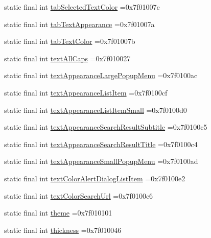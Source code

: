 \begin{DoxyCompactItemize}
\item 
static final int \hyperlink{classcheck_1_1test_1_1_r_1_1attr_a270a1ff857735c964f5bcf59290f4b71}{tab\+Selected\+Text\+Color} =0x7f01007c
\item 
static final int \hyperlink{classcheck_1_1test_1_1_r_1_1attr_ab5c0ef23c7153d895773e5776a6bedee}{tab\+Text\+Appearance} =0x7f01007a
\item 
static final int \hyperlink{classcheck_1_1test_1_1_r_1_1attr_a5429daadf498e6cbc4dec50f3c1251e3}{tab\+Text\+Color} =0x7f01007b
\item 
static final int \hyperlink{classcheck_1_1test_1_1_r_1_1attr_a09d1fb38439d083ce88110c7038a7949}{text\+All\+Caps} =0x7f010027
\item 
static final int \hyperlink{classcheck_1_1test_1_1_r_1_1attr_a378cf97243180991de45fbf2a470b74f}{text\+Appearance\+Large\+Popup\+Menu} =0x7f0100ac
\item 
static final int \hyperlink{classcheck_1_1test_1_1_r_1_1attr_a0903b5738e5ebb9f752a3eeb9edb6438}{text\+Appearance\+List\+Item} =0x7f0100cf
\item 
static final int \hyperlink{classcheck_1_1test_1_1_r_1_1attr_a207e3b80940457620df45d83ed20ab6d}{text\+Appearance\+List\+Item\+Small} =0x7f0100d0
\item 
static final int \hyperlink{classcheck_1_1test_1_1_r_1_1attr_add36b7b3af37d5ad8320ceb443d2dd2f}{text\+Appearance\+Search\+Result\+Subtitle} =0x7f0100c5
\item 
static final int \hyperlink{classcheck_1_1test_1_1_r_1_1attr_a13a9931a99a930b514fe408c215c4cd6}{text\+Appearance\+Search\+Result\+Title} =0x7f0100c4
\item 
static final int \hyperlink{classcheck_1_1test_1_1_r_1_1attr_a8b92407d50d5bf64b97cf69cd93cfc6e}{text\+Appearance\+Small\+Popup\+Menu} =0x7f0100ad
\item 
static final int \hyperlink{classcheck_1_1test_1_1_r_1_1attr_a425298cc593c901237a84e3e18629040}{text\+Color\+Alert\+Dialog\+List\+Item} =0x7f0100e2
\item 
static final int \hyperlink{classcheck_1_1test_1_1_r_1_1attr_a7247a03fccf89e3fef4e08fc3f8ae297}{text\+Color\+Search\+Url} =0x7f0100c6
\item 
static final int \hyperlink{classcheck_1_1test_1_1_r_1_1attr_ae33e84d61630420c9ba3073185b3245d}{theme} =0x7f010101
\item 
static final int \hyperlink{classcheck_1_1test_1_1_r_1_1attr_a124aa9eea72db03186b6295aebdcfec8}{thickness} =0x7f010046
\item 

\end{DoxyCompactItemize}
